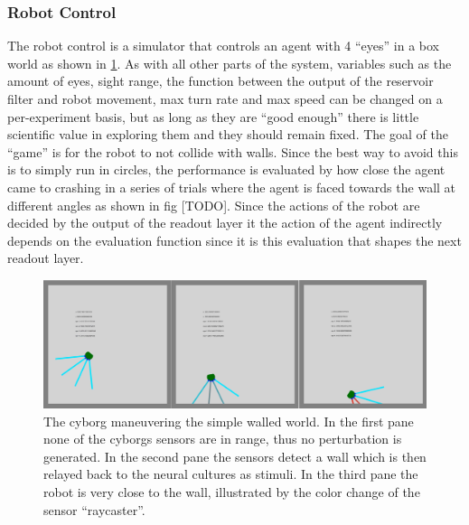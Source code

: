\subsubsection{Robot Control}
The robot control is a simulator that controls an agent with 4 ``eyes'' in a box
world as shown in \ref{figGame}.
As with all other parts of the system, variables such as the amount of eyes, sight
range, the function between the output of the reservoir filter and robot
movement, max turn rate and max speed can be changed on a per-experiment basis,
but as long as they are ``good enough'' there is little scientific value in
exploring them and they should remain fixed.
The goal of the ``game'' is for the robot to not collide with walls.
Since the best way to avoid this is to simply run in circles, the performance is
evaluated by how close the agent came to crashing in a series of trials where
the agent is faced towards the wall at different angles as shown in fig [TODO].
Since the actions of the robot are decided by the output of the readout layer it
the action of the agent indirectly depends on the evaluation function since it
is this evaluation that shapes the next readout layer.
\begin{figure}[h!]
  \centering
  \includegraphics[width=1\textwidth]{fig/TAC/game2.png}
  \caption{
    The cyborg maneuvering the simple walled world. In the first pane none of
    the cyborgs sensors are in range, thus no perturbation is generated.
    In the second pane the sensors detect a wall which is then relayed back to
    the neural cultures as stimuli.
    In the third pane the robot is very close to the wall, illustrated by the
    color change of the sensor ``raycaster''.
  }
  \label{figGame}
\end{figure}
